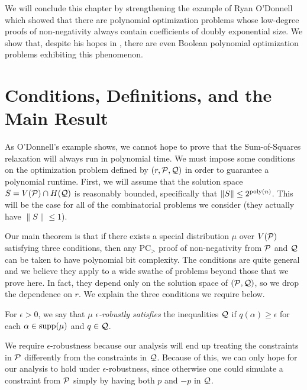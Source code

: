 We will conclude this chapter by strengthening the example of Ryan O'Donnell which showed that there are polynomial optimization problems whose low-degree proofs of non-negativity always contain coefficients of doubly exponential size. We show that, despite his hopes in \cite{ODon16}, there are even Boolean polynomial optimization problems exhibiting this phenomenon. 

\section{Conditions, Definitions, and the Main Result}
As O'Donnell's example shows, we cannot hope to prove that the Sum-of-Squares relaxation will always run in polynomial time. We must impose some conditions on the optimization problem defined by $(r, \mathcal P, \mathcal Q)$ in order to guarantee a polynomial runtime. First, we will assume that the solution space $S = V(\mathcal P) \cap H(\mathcal Q)$ is reasonably bounded, specifically that $\|S\| \leq 2^{\operatorname{poly}(n)}$. This will be the case for all of the combinatorial problems we consider (they actually have $\|S\| \leq 1$).

Our main theorem is that if there exists a special distribution $\mu$ over $V(\mathcal P)$ satisfying three conditions, then any PC$_>$ proof of non-negativity from $\mathcal P$ and $\mathcal Q$ can be taken to have polynomial bit complexity. The conditions are quite general and we believe they apply to a wide swathe of problems beyond those that we prove here. In fact, they depend only on the solution space of $(\mathcal P, \mathcal Q)$, so we drop the dependence on $r$. We explain the three conditions we require below.

\begin{definition}
For $\epsilon > 0$, we say that $\mu$ \emph{$\epsilon$-robustly satisfies} the inequalities $\mathcal Q$ if $q(\alpha) \geq \epsilon$ for each $\alpha \in \operatorname{supp}(\mu)$ and $q \in \mathcal Q$. 
\end{definition}
We require $\epsilon$-robustness because our analysis will end up treating the constraints in $\mathcal P$ differently from the constraints in $\mathcal Q$.
Because of this, we can only hope for our analysis to hold under $\epsilon$-robustness, since otherwise one could simulate a constraint from $\mathcal P$ simply by having both $p$ and $-p$ in $\mathcal Q$. 

